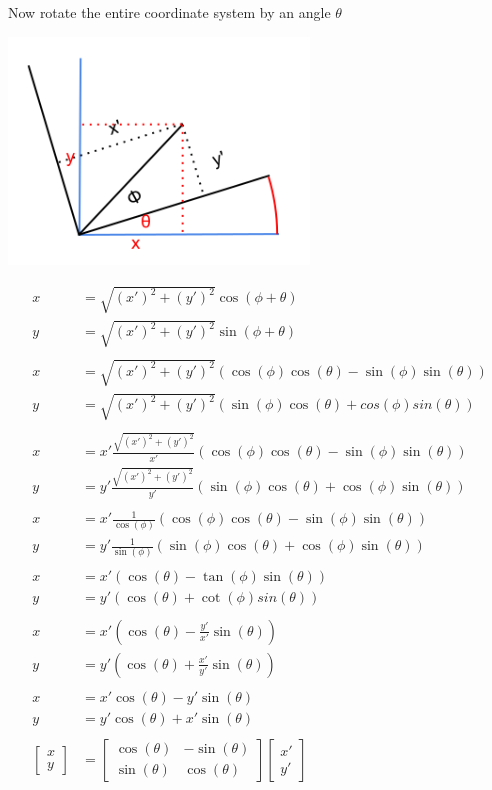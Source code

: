 Now rotate the entire coordinate system by an angle \(\theta\)\\
\begin{center}
\includegraphics[width=8cm]{Linear_Algebra/rotational_matrix_diag2}
\end{center}

\begin{align*}
x &= \sqrt{(x')^2 + (y')^2}\cos(\phi + \theta) \\
y &= \sqrt{(x')^2 + (y')^2}\sin(\phi + \theta)\\
\\
x &= \sqrt{(x')^2 + (y')^2}(\cos(\phi)\cos(\theta) - \sin(\phi)\sin(\theta) ) \\
y &= \sqrt{(x')^2 + (y')^2}(\sin(\phi)\cos(\theta) + cos(\phi)sin(\theta) )\\
\\
x &= x'\frac{\sqrt{(x')^2 + (y')^2}}{x'}(\cos(\phi)\cos(\theta) - \sin(\phi)\sin(\theta) ) \\
y &= y'\frac{\sqrt{(x')^2 + (y')^2}}{y'}(\sin(\phi)\cos(\theta) + \cos(\phi)\sin(\theta) )\\
\\
x &= x'\frac{1}{\cos(\phi)}(\cos(\phi)\cos(\theta) - \sin(\phi)\sin(\theta) ) \\
y &= y'\frac{1}{\sin(\phi)}(\sin(\phi)\cos(\theta) + \cos(\phi)\sin(\theta) )\\
\\
x &= x'(\cos(\theta) - \tan(\phi)\sin(\theta) ) \\
y &= y'(\cos(\theta) + \cot(\phi)sin(\theta) ) \\
\\
x &= x'(\cos(\theta) - \frac{y'}{x'}\sin(\theta) ) \\
y &= y'(\cos(\theta) + \frac{x'}{y'}\sin(\theta) ) \\
\\
x &= x'\cos(\theta) - y'\sin(\theta) \\
y &= y'\cos(\theta) + x'\sin(\theta)  \\
\\
\left[
\begin{matrix}
x\\
y
\end{matrix}
\right] &=
\left[ \begin{matrix}
\cos(\theta) & -\sin(\theta) \\
\sin(\theta) &  \cos(\theta) 
\end{matrix}\right] 
\left[ \begin{matrix}
x' \\
y'
\end{matrix} \right]
\end{align*}

